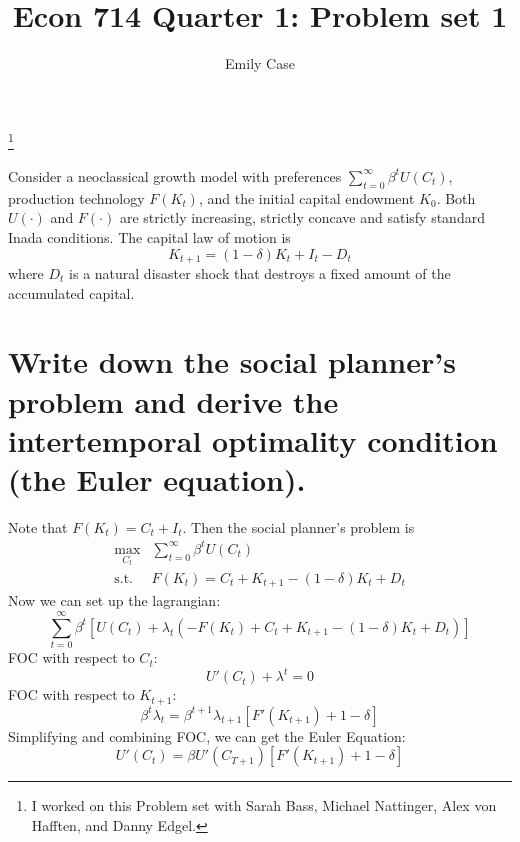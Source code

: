 \documentclass[]{article}
\title{Econ 714 Quarter 1: Problem set 1 }
\author{Emily Case}
\newcommand\blfootnote[1]{%
	\begingroup
	\renewcommand\thefootnote{}\footnote{#1}%
	\addtocounter{footnote}{-1}%
	\endgroup
}
\begin{document}
	
	\maketitle
	
	\blfootnote{I worked on this Problem set with Sarah Bass, Michael Nattinger, Alex von Hafften, and Danny Edgel.} 


Consider a neoclassical growth model with preferences $\sum_{t=0}^\infty \beta^t U(C_t)$, production technology $F(K_t)$,  and the initial capital endowment $K_0$.  Both $U(\cdot)$ and $F(\cdot)$ are strictly increasing, strictly concave and satisfy standard Inada conditions.  The capital law of motion is \[K_{t+1}= (1-\delta)K_t+I_t-D_t\] where $D_t$ is a natural disaster shock that destroys a fixed amount of the accumulated capital.

\section{Write down the social planner’s problem and derive the intertemporal optimality condition (the Euler equation).}
Note that $F(K_t) = C_t + I_t$. Then the social planner's problem is 
\begin{align*}
\max\limits_{C_t} & \sum_{t=0}^\infty \beta^t U(C_t)  \\
\text{s.t.}\; & F(K_t)  = C_t + K_{t+1} -(1-\delta)K_t +D_t 
\end{align*}
Now we can set up the lagrangian:
\[\sum_{t=0}^\infty \beta^t \left[ U(C_t)+ \lambda_t (-F(K_t) + C_t + K_{t+1} -(1-\delta)K_t +D_t )\right]\]
FOC with respect to $C_t$:
\[U'(C_t) + \lambda^t = 0 \]
FOC with respect to $K_{t+1}$:
\[\beta^t\lambda_t = \beta^{t+1}\lambda_{t+1} [F'(K_{t+1})+1-\delta]
\]
Simplifying and combining FOC, we can get the Euler Equation:
\[U'(C_t) = \beta U'(C_{T+1}) [F'(K_{t+1})+1-\delta]
\]
\end{document}
